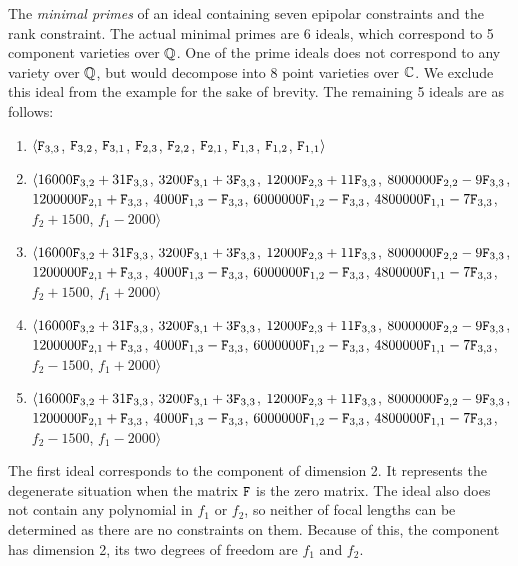 \begin{exmp}
The \textit{minimal primes} of an ideal containing seven epipolar constraints and the rank constraint. The actual minimal primes are 6 ideals, which correspond to 5 component varieties over $\mathbb{Q}$. One of the prime ideals does not correspond to any variety over $\mathbb{Q}$, but would decompose into 8 point varieties over $\mathbb{C}$. We exclude this ideal from the example for the sake of brevity. The remaining 5 ideals are as follows:
\begin{enumerate}
    \item   $\langle\mathtt{F}_{3,3}$, $\mathtt{F}_{3,2}$, $\mathtt{F}_{3,1}$, $\mathtt{F}_{2,3}$, $\mathtt{F}_{2,2}$, $\mathtt{F}_{2,1}$, $\mathtt{F}_{1,3}$, $\mathtt{F}_{1,2}$, $\mathtt{F}_{1,1}\rangle$
    \item $\langle16000 \mathtt{F}_{3,2} + 31 \mathtt{F}_{3,3}$, $3200 \mathtt{F}_{3,1} + 3 \mathtt{F}_{3,3}$, $12000 \mathtt{F}_{2,3} + 11 \mathtt{F}_{3,3}$, $8000000 \mathtt{F}_{2,2} - 9 \mathtt{F}_{3,3}$, $1200000 \mathtt{F}_{2,1} + \mathtt{F}_{3,3}$, $4000 \mathtt{F}_{1,3} - \mathtt{F}_{3,3}$, $       6000000 \mathtt{F}_{1,2} - \mathtt{F}_{3,3}$, $4800000 \mathtt{F}_{1,1} - 7 \mathtt{F}_{3,3}$, $f_2 + 1500$, $f_1 - 2000\rangle$ 
    \item  $\langle16000 \mathtt{F}_{3,2} + 31 \mathtt{F}_{3,3}$, $3200 \mathtt{F}_{3,1} + 3 \mathtt{F}_{3,3}$, $12000 \mathtt{F}_{2,3} + 11 \mathtt{F}_{3,3}$, $8000000 \mathtt{F}_{2,2} - 9 \mathtt{F}_{3,3}$, $1200000 \mathtt{F}_{2,1} + \mathtt{F}_{3,3}$, $4000 \mathtt{F}_{1,3} - \mathtt{F}_{3,3}$, $6000000 \mathtt{F}_{1,2} - \mathtt{F}_{3,3}$, $4800000 \mathtt{F}_{1,1} - 7 \mathtt{F}_{3,3}$, $f_2 + 1500$, $f_1 +        2000\rangle$
    \item $\langle16000 \mathtt{F}_{3,2} + 31 \mathtt{F}_{3,3}$, $3200 \mathtt{F}_{3,1} + 3 \mathtt{F}_{3,3}$, $12000 \mathtt{F}_{2,3} + 11 \mathtt{F}_{3,3}$, $8000000 \mathtt{F}_{2,2} - 9 \mathtt{F}_{3,3}$, $1200000 \mathtt{F}_{2,1} + \mathtt{F}_{3,3}$, $4000 \mathtt{F}_{1,3} - \mathtt{F}_{3,3}$, $6000000 \mathtt{F}_{1,2} - \mathtt{F}_{3,3}$, $4800000 \mathtt{F}_{1,1} - 7 \mathtt{F}_{3,3}$, $f_2 -        1500$, $f_1 + 2000\rangle$
    \item $\langle16000 \mathtt{F}_{3,2} + 31 \mathtt{F}_{3,3}$, $3200 \mathtt{F}_{3,1} + 3 \mathtt{F}_{3,3}$, $12000 \mathtt{F}_{2,3} + 11 \mathtt{F}_{3,3}$, $8000000 \mathtt{F}_{2,2} - 9 \mathtt{F}_{3,3}$, $1200000 \mathtt{F}_{2,1} + \mathtt{F}_{3,3}$, $4000 \mathtt{F}_{1,3} - \mathtt{F}_{3,3}$, $6000000 \mathtt{F}_{1,2} - \mathtt{F}_{3,3}$, $4800000 \mathtt{F}_{1,1} - 7        \mathtt{F}_{3,3}$, $f_2 - 1500$, $f_1 - 2000\rangle$
\end{enumerate}
\end{exmp}


The first ideal corresponds to the component of dimension 2. It represents the degenerate situation when  the matrix $\mathtt{F}$ is the zero matrix. The ideal also does not contain any polynomial in $f_1$ or $f_2$, so neither of focal lengths can be determined as there are no constraints on them. Because of this, the component has dimension 2, its two degrees of freedom are $f_1$ and $f_2$.

